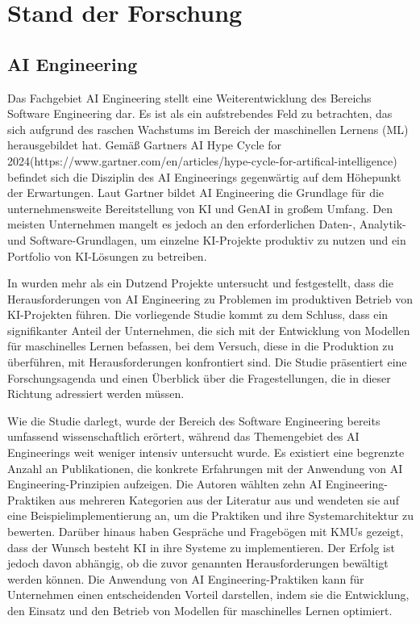 \documentclass[11pt,a4paper,pointlessnumbers]{scrartcl}
\theoremstyle{break}
\numberwithin{equation}{section}
\begin{document}
\section{Stand der Forschung}
\subsection{AI Engineering}
Das Fachgebiet AI Engineering stellt eine Weiterentwicklung des Bereichs Software Engineering dar. Es ist als ein aufstrebendes Feld zu betrachten, das sich aufgrund des raschen Wachstums im Bereich der maschinellen Lernens (ML) herausgebildet hat. Gemäß Gartners \glqq AI Hype Cycle for 2024\grqq (https://www.gartner.com/en/articles/hype-cycle-for-artifical-intelligence) befindet sich die Disziplin des AI Engineerings gegenwärtig auf dem Höhepunkt der Erwartungen. Laut Gartner bildet AI Engineering die Grundlage für die unternehmensweite Bereitstellung von KI und GenAI in großem Umfang. Den meisten Unternehmen mangelt es jedoch an den erforderlichen Daten-, Analytik- und Software-Grundlagen, um einzelne KI-Projekte produktiv zu nutzen und ein Portfolio von KI-Lösungen zu betreiben. 

In \cite{boschEngineeringAISystems2021} wurden mehr als ein Dutzend Projekte untersucht und festgestellt, dass die Herausforderungen von AI Engineering zu Problemen im produktiven Betrieb von KI-Projekten führen. Die vorliegende Studie kommt zu dem Schluss, dass ein signifikanter Anteil der Unternehmen, die sich mit der Entwicklung von Modellen für maschinelles Lernen befassen, bei dem Versuch, diese in die Produktion zu überführen, mit Herausforderungen konfrontiert sind. Die Studie präsentiert eine Forschungsagenda und einen Überblick über die Fragestellungen, die in dieser Richtung adressiert werden müssen. 

Wie die Studie \cite{groteCaseStudyAI2023} darlegt, wurde der Bereich des Software Engineering bereits umfassend wissenschaftlich erörtert, während das Themengebiet des AI Engineerings weit weniger intensiv untersucht wurde. Es existiert eine begrenzte Anzahl an Publikationen, die konkrete Erfahrungen mit der Anwendung von AI Engineering-Prinzipien aufzeigen. Die Autoren wählten zehn AI Engineering-Praktiken aus mehreren Kategorien aus der Literatur aus und wendeten sie auf eine Beispielimplementierung an, um die Praktiken und ihre Systemarchitektur zu bewerten. Darüber hinaus haben Gespräche und Fragebögen mit KMUs gezeigt, dass der Wunsch besteht KI in ihre Systeme zu implementieren. Der Erfolg ist jedoch davon abhängig, ob die zuvor genannten Herausforderungen bewältigt werden können. Die Anwendung von AI Engineering-Praktiken kann für Unternehmen einen entscheidenden Vorteil darstellen, indem sie die Entwicklung, den Einsatz und den Betrieb von Modellen für maschinelles Lernen optimiert.
\end{document}
